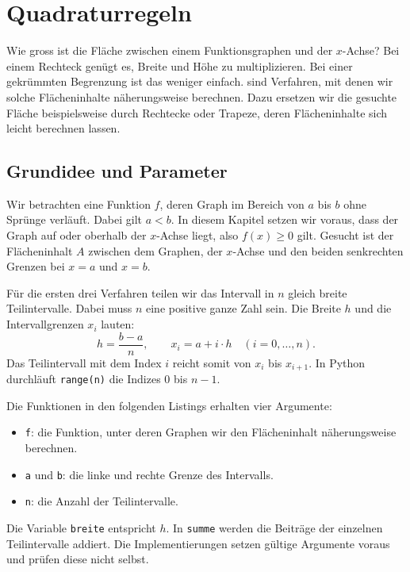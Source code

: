 \chapter{Quadraturregeln}\label{ch:quadraturregeln}

Wie gross ist die Fläche zwischen einem Funktionsgraphen und der $x$-Achse?
Bei einem Rechteck genügt es, Breite und Höhe zu multiplizieren. Bei einer gekrümmten Begrenzung ist das weniger einfach.
 sind Verfahren, mit denen wir solche Flächeninhalte näherungsweise berechnen. Dazu ersetzen wir die gesuchte Fläche beispielsweise durch Rechtecke oder Trapeze, deren Flächeninhalte sich leicht berechnen lassen.

\section{Grundidee und Parameter}

Wir betrachten eine Funktion $f$, deren Graph im Bereich von $a$ bis $b$ ohne Sprünge verläuft. Dabei gilt $a<b$. In diesem Kapitel setzen wir voraus, dass der Graph auf oder oberhalb der $x$-Achse liegt, also $f(x)\geq 0$ gilt.
Gesucht ist der Flächeninhalt $A$ zwischen dem Graphen, der $x$-Achse und den beiden senkrechten Grenzen bei $x=a$ und $x=b$.

Für die ersten drei Verfahren teilen wir das Intervall in $n$ gleich breite Teilintervalle. Dabei muss $n$ eine positive ganze Zahl sein. Die Breite $h$ und die Intervallgrenzen $x_i$ lauten:
\[
    h = \frac{b-a}{n}, \qquad x_i = a + i\cdot h \quad (i=0,\ldots,n).
\]
Das Teilintervall mit dem Index $i$ reicht somit von $x_i$ bis $x_{i+1}$. In Python durchläuft \lstinline|range(n)| die Indizes $0$ bis $n-1$.

Die Funktionen in den folgenden Listings erhalten vier Argumente:
\begin{itemize}
    \item \lstinline|f|: die Funktion, unter deren Graphen wir den Flächeninhalt näherungsweise berechnen.
    \item \lstinline|a| und \lstinline|b|: die linke und rechte Grenze des Intervalls.
    \item \lstinline|n|: die Anzahl der Teilintervalle.
\end{itemize}
Die Variable \lstinline|breite| entspricht $h$. In \lstinline|summe| werden die Beiträge der einzelnen Teilintervalle addiert. Die Implementierungen setzen gültige Argumente voraus und prüfen diese nicht selbst.

